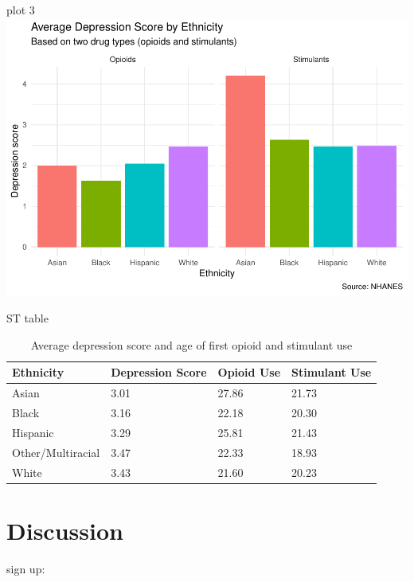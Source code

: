 \documentclass[man]{apa6}
\begin{document}
plot 3
\includegraphics{Final_Paper_Group_3_files/figure-latex/ST_plott-1.pdf}

ST table

\begin{table}[tbp]
\begin{center}
\begin{threeparttable}
\caption{\label{tab:ST_table}Average depression score and age of first opioid and stimulant use}
\begin{tabular}{llll}
\toprule
Ethnicity & \multicolumn{1}{c}{Depression Score} & \multicolumn{1}{c}{Opioid Use} & \multicolumn{1}{c}{Stimulant Use}\\
\midrule
Asian & 3.01 & 27.86 & 21.73\\
Black & 3.16 & 22.18 & 20.30\\
Hispanic & 3.29 & 25.81 & 21.43\\
Other/Multiracial & 3.47 & 22.33 & 18.93\\
White & 3.43 & 21.60 & 20.23\\
\bottomrule
\end{tabular}
\end{threeparttable}
\end{center}
\end{table}

\section{Discussion}\label{discussion}

sign up:
\end{document}
